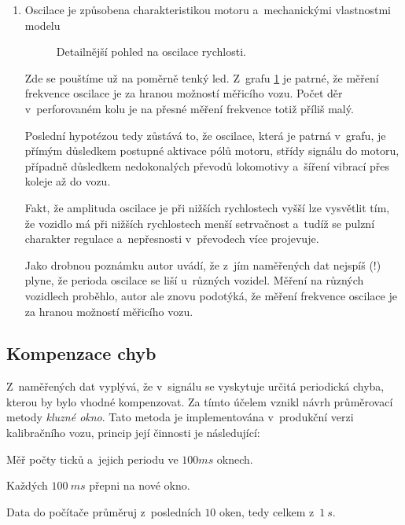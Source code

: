 \begin{enumerate}
\item Oscilace je způsobena charakteristikou motoru a~mechanickými vlastnostmi
modelu

\begin{figure}[h]

\caption{Detailnější pohled na oscilace rychlosti.}
\label{fig:speed-presny}
\end{figure}

Zde se pouštíme už na poměrně tenký led. Z~grafu \ref{fig:speed-presny} je
patrné, že měření frekvence oscilace je za hranou možností měřicího
vozu. Počet děr v~perforovaném kolu je na přesné měření frekvence totiž příliš
malý.

Poslední hypotézou tedy zůstává to, že oscilace, která je patrná v~grafu,
je přímým důsledkem postupné aktivace pólů motoru, střídy signálu do motoru,
případně důsledkem nedokonalých převodů lokomotivy a~šíření vibrací přes
koleje až do vozu.

Fakt, že amplituda oscilace je při nižších rychlostech vyšší lze vysvětlit tím,
že vozidlo má při nižších rychlostech menší setrvačnost a~tudíž se pulzní
charakter regulace a~nepřesnosti v~převodech více projevuje.

Jako drobnou poznámku autor uvádí, že z~jím naměřených dat nejspíš (!) plyne,
že perioda oscilace se liší u~různých vozidel. Měření na různých vozidlech
proběhlo, autor ale znovu podotýká, že měření frekvence oscilace je za hranou
možností měřicího vozu.

\end{enumerate}

\subsection{Kompenzace chyb}
\label{subsec:wsm-kompenzace}

Z~naměřených dat vyplývá, že v~signálu se vyskytuje určitá periodická chyba,
kterou by bylo vhodné kompenzovat. Za tímto účelem vznikl návrh průměrovací
metody \textit{kluzné okno}. Tato metoda je implementována v~produkční verzi
kalibračního vozu, princip její činnosti je následující:

\begin{compactenum}
\item Měř počty ticků a~jejich periodu ve $100ms$ oknech.
\item Každých $100\ ms$ přepni na nové okno.
\item Data do počítače průměruj z~posledních $10$ oken, tedy celkem z~$1\ s$.
\end{compactenum}


